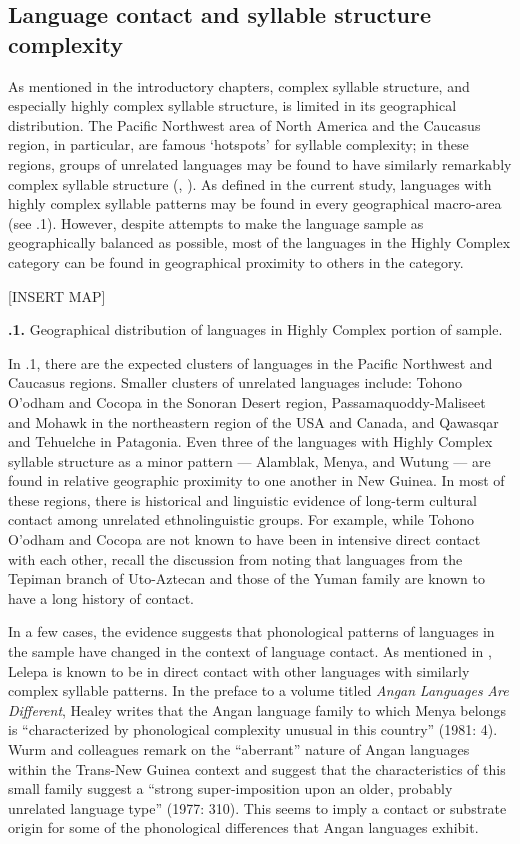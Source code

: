 \subsection{Language contact and syllable structure complexity}\label{sec:8.4.5}

  As mentioned in the introductory chapters, complex syllable structure, and especially highly complex syllable structure, is limited in its geographical distribution. The Pacific Northwest area of North America and the Caucasus region, in particular, are famous ‘hotspots’ for syllable complexity; in these regions, groups of unrelated languages may be found to have similarly remarkably complex syllable structure (\citealt{Chirikba2008}, \citealt{ThompsonKinkade1990}). As defined in the current study, languages with highly complex syllable patterns may be found in every geographical macro-area (see .1). However, despite attempts to make the language sample as geographically balanced as possible, most of the languages in the Highly Complex category can be found in geographical proximity to others in the category.

[INSERT MAP]

\textbf{.1.} Geographical distribution of languages in Highly Complex portion of sample.

  In .1, there are the expected clusters of languages in the Pacific Northwest and Caucasus regions. Smaller clusters of unrelated languages include: Tohono O’odham and Cocopa in the Sonoran Desert region, Passamaquoddy-Maliseet and Mohawk in the northeastern region of the USA and Canada, and Qawasqar and Tehuelche in Patagonia. Even three of the languages with Highly Complex syllable structure as a minor pattern — Alamblak, Menya, and Wutung — are found in relative geographic proximity to one another in New Guinea. In most of these regions, there is historical and linguistic evidence of long-term cultural contact among unrelated ethnolinguistic groups. For example, while Tohono O’odham and Cocopa are not known to have been in intensive direct contact with each other, recall the discussion from  noting that languages from the Tepiman branch of Uto-Aztecan and those of the Yuman family are known to have a long history of contact. 

  In a few cases, the evidence suggests that phonological patterns of languages in the sample have changed in the context of language contact. As mentioned in , Lelepa is known to be in direct contact with other languages with similarly complex syllable patterns. In the preface to a volume titled \textit{Angan} \textit{Languages} \textit{Are} \textit{Different}, Healey writes that the Angan language family to which Menya belongs is “characterized by phonological complexity unusual in this country” (1981: 4). Wurm and colleagues remark on the “aberrant” nature of Angan languages within the Trans-New Guinea context and suggest that the characteristics of this small family suggest a “strong super-imposition upon an older, probably unrelated language type” (1977: 310). This seems to imply a contact or substrate origin for some of the phonological differences that Angan languages exhibit.

